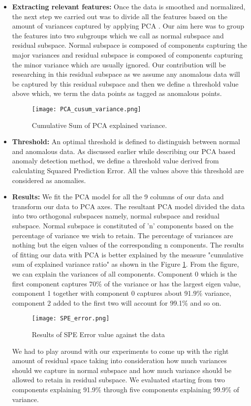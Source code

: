\begin{enumerate}
\begin{itemize}
\item\textbf{Extracting relevant features:} Once the data is smoothed and normalized, the next step we carried out was to divide all the features based on the amount of variances captured by applying PCA . Our aim here was to group the features into two subgroups which we call as normal subspace and residual subspace. Normal subspace is composed of components capturing the major variances and residual subspace is composed of components capturing the minor variance which are usually ignored. Our contribution will be researching in this residual subspace as we assume any anomalous data will be captured by this residual subspace and then we define a threshold value above which, we term the data points as tagged as anomalous points. 
   
\begin{figure}
\centerline{\texttt{[image: PCA\_cusum\_variance.png]}}
    \caption{Cumulative Sum of PCA explained variance.}
    \label{fig:PCA_cusum_variance}
\end{figure}

\item\textbf{Threshold:} An optimal threshold is defined to distinguish between normal and anomalous data. As discussed earlier while describing our PCA based anomaly detection method, we define a threshold value derived from calculating Squared Prediction Error. All the values above this threshold are considered as anomalies. 

\item\textbf{Results:} We fit the PCA model for all the 9 columns of our data and transform our data to PCA axes. The resultant PCA model divided the data into two orthogonal subspaces namely, normal subspace and residual subspace. Normal subspace is constituted of 'n' components based on the percentage of variance we wish to retain. The percentage of variances are nothing but the eigen values of the corresponding n components. The results of fitting our data with PCA is better explained by the measure "cumulative sum of explained variance ratio" as shown in the Figure \ref{fig:PCA_cusum_variance}. From the figure, we can explain the variances of all components. Component 0 which is the first component captures 70\% of the variance or has the largest eigen value, component 1 together with component 0 captures about 91.9\% variance, component 2 added  to the first two will account for 99.1\% and so on. 
\begin{figure}
\centerline{\texttt{[image: SPE\_error.png]}}
    \caption{Results of SPE Error value against the data}
    \label{fig:spe}
\end{figure}
We had to play around with our experiments to come up with the right amount of residual space taking into consideration how much variances should we capture in normal subspace and how much variance should be allowed to retain in residual subspace. We evaluated starting from two components explaining 91.9\% through five components explaining 99.9\% of variance.
\end{itemize}


\end{enumerate}
